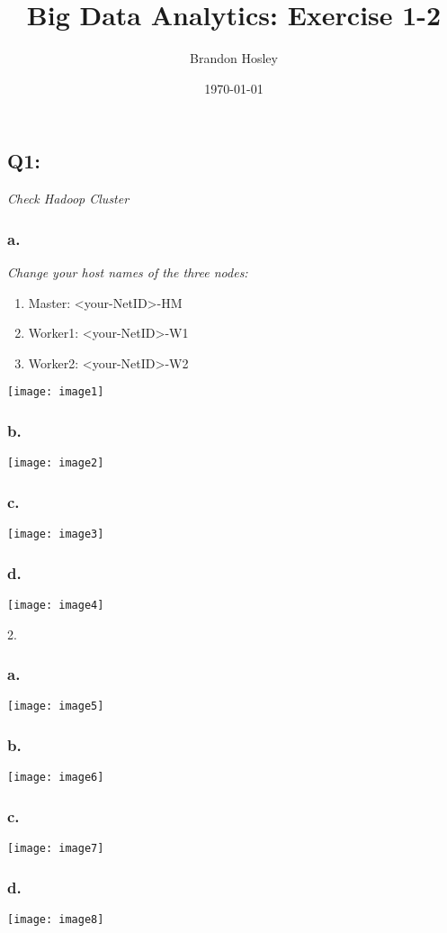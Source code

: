 \documentclass[]{article}
\title{Big Data Analytics: Exercise 1-2}
\author{Brandon Hosley}
\date{\today}
\begin{document}
\maketitle

\subsection*{Q1:}
\emph{Check Hadoop Cluster}

\subsubsection*{a.}
\emph{Change your host names of the three nodes:}
\begin{enumerate}
	\item Master: <your-NetID>-HM
	\item Worker1: <your-NetID>-W1
	\item Worker2: <your-NetID>-W2
\end{enumerate}
\texttt{[image: image1]} \vspace{-1.5em}

\subsubsection*{b.}
\texttt{[image: image2]} \vspace{-1.5em}

\subsubsection*{c.}
\texttt{[image: image3]} \vspace{-1.5em}

\subsubsection*{d.}
\texttt{[image: image4]} \vspace{-1.5em}

2.
\subsubsection*{a.}
\texttt{[image: image5]} \vspace{-1.5em}

\subsubsection*{b.}
\texttt{[image: image6]} \vspace{-1.5em}

\subsubsection*{c.}
\texttt{[image: image7]} \vspace{-1.5em}

\subsubsection*{d.}
\texttt{[image: image8]} \vspace{-1.5em}
\end{document}
